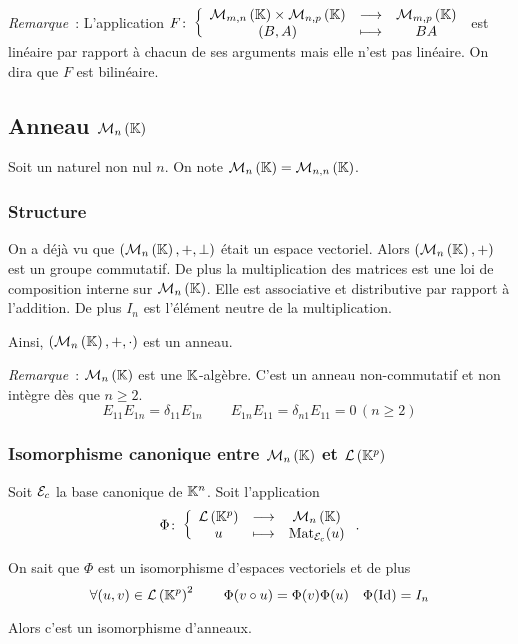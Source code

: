 \emph{Remarque}~: L'application $F\colon \left\{\begin{array}{ccc} \mathcal{M}_{m,n}\left(\mathbb{K}\right)\times \mathcal{M}_{n,p}\left(\mathbb{K}\right) & \longrightarrow &\mathcal{M}_{m,p}\left(\mathbb{K}\right)\\ (B,A) & \longmapsto & BA \end{array} \right.$ est linéaire par rapport à chacun de ses arguments mais elle n'est pas linéaire. On dira que $F$ est bilinéaire.

\subsection{Anneau $\mathcal{M}_{n}\left(\mathbb{K}\right)$}

Soit un naturel non nul $n$. On note $\mathcal{M}_{n}\left(\mathbb{K}\right)=\mathcal{M}_{n,n}\left(\mathbb{K}\right)$.

\subsubsection{Structure}

On a déjà vu que $(\mathcal{M}_{n}\left(\mathbb{K}\right),+,\perp)$ était un espace vectoriel. Alors $(\mathcal{M}_{n}\left(\mathbb{K}\right),+)$ est un groupe commutatif. De plus la multiplication des matrices est une loi de composition interne sur $\mathcal{M}_{n}\left(\mathbb{K}\right)$. Elle est associative et distributive par rapport à l'addition. De plus $I_n$ est l'élément neutre de la multiplication.

Ainsi, $(\mathcal{M}_{n}\left(\mathbb{K}\right),+,\cdot)$ est un anneau.

\emph{Remarque}~: $\mathcal{M}_{n}\left(\mathbb{K}\right)$ est une $\mathbb{K}$-algèbre. C'est un anneau non-commutatif et non intègre dès que $n\geqslant 2$.
\begin{equation}
  E_{11}E_{1n}=\delta_{11}E_{1n} \qquad E_{1n}E_{11}=\delta_{n1}E_{11}=0 \, (n\geqslant 2)
\end{equation}

\subsubsection{Isomorphisme canonique entre $\mathcal{M}_{n}\left(\mathbb{K}\right)$ et $\mathcal{L}\left(\mathbb{K}^p\right)$}

Soit $\mathcal{E}_c$ la base canonique de $\mathbb{K}^n$. Soit l'application
\begin{equation}
  \Phi\colon \left\{\begin{array}{ccc} \mathcal{L}\left(\mathbb{K}^p\right) & \longrightarrow &\mathcal{M}_{n}\left(\mathbb{K}\right)\\ u & \longmapsto & \mathrm{Mat}_{\mathcal{E}_c}(u) \end{array} \right..
\end{equation}

On sait que $\Phi$ est un isomorphisme d'espaces vectoriels et de plus
\begin{equation}
  \forall (u,v) \in \mathcal{L}\left(\mathbb{K}^p\right)^2 \qquad \Phi(v \circ u) =\Phi(v) \Phi(u) \quad \Phi(\operatorname{Id})=I_n
\end{equation}

Alors c'est un isomorphisme d'anneaux.

